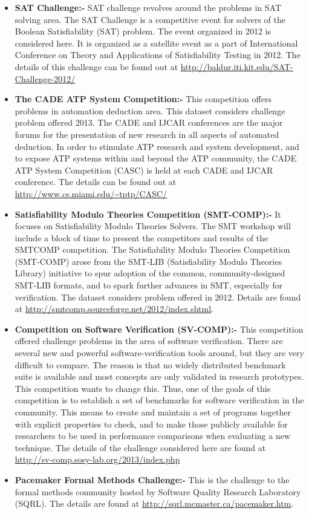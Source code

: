 \documentclass[11pt,letterpaper]{report}
\begin{document}
\begin{itemize}
\item \textbf{SAT Challenge:- } SAT challenge revolves around the problems in SAT solving area. The SAT Challenge is a competitive event for solvers of the Boolean Satisfiability (SAT) problem. The event organized in 2012 is considered here. It is organized as a satellite event as a part of International Conference on Theory and Applications of Satisfiability Testing in 2012. The details of this challenge can be found out at \url{http://baldur.iti.kit.edu/SAT-Challenge-2012/} \cite{SAT}
\item \textbf{The CADE ATP System Competition:- } This competition offers problems in automation deduction area. This dataset considers challenge problem offered 2013. The CADE and IJCAR conferences are the major forums for the presentation of new research in all aspects of automated deduction. In order to stimulate ATP research and system development, and to expose ATP systems within and beyond the ATP community, the CADE ATP System Competition (CASC) is held at each CADE and IJCAR conference. The details can be found out at \url{http://www.cs.miami.edu/~tptp/CASC/} \cite{CADE}
\item \textbf{Satisfiability Modulo Theories Competition (SMT-COMP):- } It focuses on Satisfiability Modulo Theories Solvers. The SMT workshop will include a block of time to present the competitors and results of the SMTCOMP competition. The Satisfiability Modulo Theories Competition (SMT-COMP) arose from the SMT-LIB (Satisfiability Modulo Theories Library) initiative to spur adoption of the common, community-designed SMT-LIB formats, and to spark further advances in SMT, especially for verification. The dataset considers problem offered in 2012. Details are found at \url{http://smtcomp.sourceforge.net/2012/index.shtml}. \cite{SMT}
\item \textbf{Competition on Software Verification (SV-COMP):- } This competition offered challenge problems in the area of software verification. There are several new and powerful software-verification tools around, but they are very difficult to compare. The reason is that no widely distributed benchmark suite is available and most concepts are only validated in research prototypes. This competition wants to change this. Thus, one of the goals of this competition is to establish a set of benchmarks for software verification in the community. This means to create and maintain a set of programs together with explicit properties to check, and to make those publicly available for researchers to be used in performance comparisons when evaluating a new technique. The details of the challenge considered here are found at \url{http://sv-comp.sosy-lab.org/2013/index.php} \cite{SV}
\item \textbf{Pacemaker Formal Methods Challenge:- } This is the challenge to the formal methods community hosted by Software Quality Research Laboratory (SQRL). The details are found at \url{http://sqrl.mcmaster.ca/pacemaker.htm}. \cite{Pacemaker}
\end{itemize}
\end{document}

